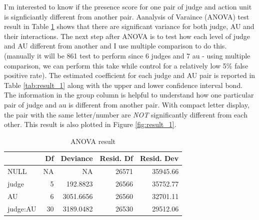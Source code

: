 \documentclass{monashthesis}
\begin{document}
I'm interested to know if the presence score for one pair of judge and action unit is signficiantly different from another pair. Aanalysis of Varaince (ANOVA) test result in Table \ref{tab:anova} shows that there are significant variance for both judge, AU and their interactions. The next step after ANOVA is to test how each level of judge and AU different from another and I use multiple comparison to do this. (manually it will be 861 test to perform since 6 judges and 7 au - using multiple comparison, we can perform this take while control for a relatively low 5\% false positive rate). The estimated coefficient for each judge and AU pair is reported in Table \ref{tab:result_1} along with the upper and lower confidence interval bond. The information in the group column is helpful to understand how one particular pair of judge and au is different from another pair. With compact letter display, the pair with the same letter/number are \emph{NOT} significantly different from each other. This result is also plotted in Figure \ref{fig:result_1}.

\begin{table}[t]

\caption{\label{tab:unnamed-chunk-9}\label{tab:anova}ANOVA result}
\centering
\begin{tabular}{l|r|r|r|r}
\hline
  & Df & Deviance & Resid. Df & Resid. Dev\\
\hline
NULL & NA & NA & 26571 & 35945.66\\
\hline
judge & 5 & 192.8823 & 26566 & 35752.77\\
\hline
AU & 6 & 3051.6656 & 26560 & 32701.11\\
\hline
judge:AU & 30 & 3189.0482 & 26530 & 29512.06\\
\hline
\end{tabular}
\end{table}
\end{document}
